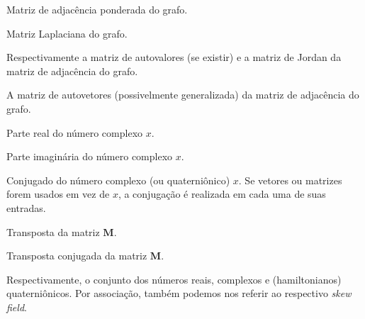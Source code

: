 

\item[$ \mathbf{A} $] Matriz de adjacência ponderada do grafo.
\item[$ \mathbf{L} $] Matriz Laplaciana do grafo.
\item[$ \mathbf{\Lambda}, \mathbf{J} $] Respectivamente a matriz de autovalores (se existir) e a matriz de Jordan da matriz de adjacência do grafo.
\item[$ \mathbf{V} $] A matriz de autovetores (possivelmente generalizada) da matriz de adjacência do grafo.
\item[$\mathcal{R}e \{ x \}$] Parte real do número complexo $x$.
\item[$\mathcal{I}m \{ x \}$] Parte imaginária do número complexo $x$.
\item[$ \overline{x} $] Conjugado do número complexo (ou quaterniônico) $x$. Se vetores ou matrizes forem usados em vez de $x$, a conjugação é realizada em cada uma de suas entradas.
\item[$\mathbf{M}^T$] Transposta da matriz $\mathbf{M}$.
\item[$\mathbf{M}^H$] Transposta conjugada da matriz $\mathbf{M}$.
\item[$\mathbb{R}$, $\mathbb{C}$ e $\mathbb{H}$] Respectivamente, o conjunto dos números reais, complexos e (hamiltonianos) quaterniônicos. Por associação, também podemos nos referir ao respectivo \emph{skew field}.